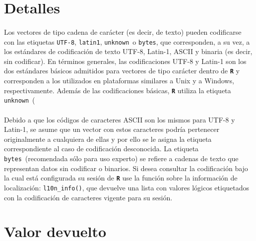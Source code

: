 \documentclass{article}[letter, 12pt]
\def\code#1{\texttt{#1}}
\def\pseudocode#1{\texttt{\color{gray}\small#1}}
\def\codename#1{\textbf{\texttt{\color{gray}#1}}}
\begin{document}
\section{\color{gray}Detalles}

\paragraph{}Los vectores de tipo cadena de carácter (es decir, de texto) pueden codificarse con las etiquetas \textquotedbl\code{UTF-8}\textquotedbl, \textquotedbl\code{latin1}\textquotedbl, \textquotedbl\code{unknown}\textquotedbl\ o \textquotedbl\code{bytes}\textquotedbl, que corresponden, a su vez, a los estándares de codificación de texto UTF-8, Latin-1, ASCII y binaria (es decir, sin codificar). En términos generales, las codificaciones UTF-8 y Latin-1 son los dos estándares básicos admitidos para vectores de tipo carácter dentro de \codename{R} y corresponden a los utilizados en plataformas similares a Unix y a Windows, respectivamente. Además de las codificaciones básicas, \codename{R} utiliza la etiqueta \textquotedbl\code{unknown}\textquotedbl\ (\color{gray}{\textquotedbl\pseudocode{desconocida}\textquotedbl}\color{black}{) para identificar cadenas de texto compuestas solamente por caracteres ASCII.}\par

\paragraph{}Debido a que los códigos de caracteres ASCII son los mismos para UTF-8 y Latin-1, se asume que un vector con estos caracteres podría pertenecer originalmente a cualquiera de ellas y por ello se le asigna la etiqueta correspondiente al caso de codificación desconocida. La etiqueta \textquotedbl\code{bytes}\textquotedbl\ (recomendada sólo para uso experto) se refiere a cadenas de texto que representan datos sin codificar o binarios. Si desea consultar la codificación bajo la cual está configurada su sesión de \codename{R} use la función sobre la información de localización: \code{l10n\_info()}, que devuelve una lista con valores lógicos etiquetados con la codificación de caracteres vigente para su sesión.\par 

\section{\color{gray}Valor devuelto}
\end{document}
